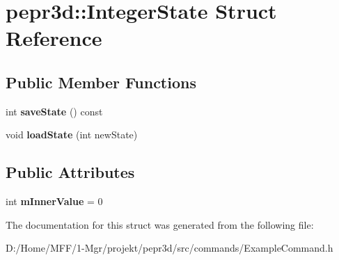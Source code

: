 \hypertarget{structpepr3d_1_1_integer_state}{}\section{pepr3d\+::Integer\+State Struct Reference}
\label{structpepr3d_1_1_integer_state}
\subsection*{Public Member Functions}
\begin{DoxyCompactItemize}
\item 
\mbox{\label{structpepr3d_1_1_integer_state_ade8303191eb97f36da4f74ffccdb6f28}} 
int {\bfseries save\+State} () const
\item 
\mbox{\label{structpepr3d_1_1_integer_state_a5551501a7645b771c495a21e3bcaa411}} 
void {\bfseries load\+State} (int new\+State)
\end{DoxyCompactItemize}
\subsection*{Public Attributes}
\begin{DoxyCompactItemize}
\item 
\mbox{\label{structpepr3d_1_1_integer_state_adc73959a7201be2f1251a0043035b93d}} 
int {\bfseries m\+Inner\+Value} = 0
\end{DoxyCompactItemize}


The documentation for this struct was generated from the following file\+:\begin{DoxyCompactItemize}
\item 
D\+:/\+Home/\+M\+F\+F/1-\/\+Mgr/projekt/pepr3d/src/commands/Example\+Command.\+h\end{DoxyCompactItemize}
